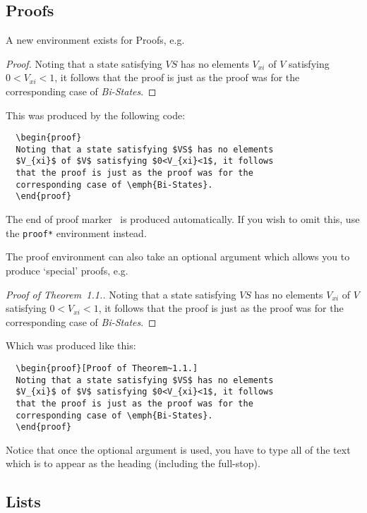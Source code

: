\documentclass{fac}
\begin{document}
\subsection{Proofs}

A new environment exists for Proofs, e.g.
%
\begin{proof}
Noting that a state satisfying $VS$ has no elements
$V_{xi}$ of $V$ satisfying $0<V_{xi}<1$, it follows
that the proof is just as the proof was for the
corresponding case of \emph{Bi-States}.
\end{proof}
%
This was produced by the following code:
%
\begin{verbatim}
  \begin{proof}
  Noting that a state satisfying $VS$ has no elements
  $V_{xi}$ of $V$ satisfying $0<V_{xi}<1$, it follows
  that the proof is just as the proof was for the
  corresponding case of \emph{Bi-States}.
  \end{proof}
\end{verbatim}
%
The end of proof marker \proofbox\ is produced automatically. If you wish
to omit this, use the \verb"proof*" environment instead.

The proof environment can also take an optional argument which allows you
to produce `special' proofs, e.g.
%
  \begin{proof}[Proof of Theorem~1.1.]
  Noting that a state satisfying $VS$ has no elements
  $V_{xi}$ of $V$ satisfying $0<V_{xi}<1$, it follows
  that the proof is just as the proof was for the
  corresponding case of \emph{Bi-States}.
  \end{proof}
%
Which was produced like this:
%
\begin{verbatim}
  \begin{proof}[Proof of Theorem~1.1.]
  Noting that a state satisfying $VS$ has no elements
  $V_{xi}$ of $V$ satisfying $0<V_{xi}<1$, it follows
  that the proof is just as the proof was for the
  corresponding case of \emph{Bi-States}.
  \end{proof}
\end{verbatim}
%
Notice that once the optional argument is used, you have to type all of
the text which is to appear as the heading (including the full-stop).

\subsection{Lists}
\end{document}
